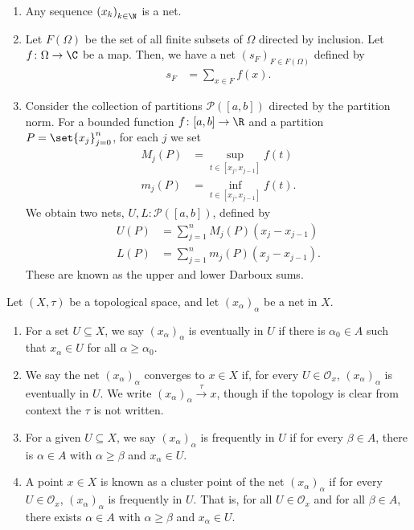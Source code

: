 \begin{example}\hfill
\begin{enumerate}[(1)]
  \item Any sequence $\left(x_k\right)_{k\in \N}$ is a net.
  \item Let $F\left(\Omega\right)$ be the set of all finite subsets of $\Omega$ directed by inclusion. Let $f\colon \Omega\rightarrow \C$ be a map. Then, we have a net $\left(s_F\right)_{F\in F\left(\Omega\right)}$ defined by
    \begin{align*}
      s_F &= \sum_{x\in F}f\left(x\right).
    \end{align*}
  \item Consider the collection of partitions $\mathcal{P}\left([a,b]\right)$ directed by the partition norm. For a bounded function $f\colon [a,b]\rightarrow \R$ and a partition $P = \set{x_j}_{j=0}^{n}$, for each $j$ we set
    \begin{align*}
      M_j\left(P\right) &= \sup_{t\in \left[x_j,x_{j-1}\right]}f(t)\\
      m_j\left(P\right) &= \inf_{t\in \left[x_j,x_{j-1}\right]}f(t).
    \end{align*}
    We obtain two nets, $U,L\colon \mathcal{P}\left([a,b]\right)$, defined by
    \begin{align*}
      U\left(P\right) &= \sum_{j=1}^{n}M_j\left(P\right)\left(x_j - x_{j-1}\right)\\
      L\left(P\right) &= \sum_{j=1}^{n}m_j\left(P\right)\left(x_j-x_{j-1}\right).
    \end{align*}
    These are known as the upper and lower Darboux sums.
\end{enumerate}
\end{example}
\begin{definition}
  Let $\left(X,\tau\right)$ be a topological space, and let $\left(x_{\alpha}\right)_{\alpha}$ be a net in $X$.
  \begin{enumerate}[(1)]
    \item For a set $U\subseteq X$, we say $\left(x_{\alpha}\right)_{\alpha}$ is eventually in $U$ if there is $\alpha_0\in A$ such that $x_{\alpha}\in U$ for all $\alpha \geq \alpha_0$.
    \item We say the net $\left(x_{\alpha}\right)_{\alpha}$ converges to $x\in X$ if, for every $U\in \mathcal{O}_{x}$, $\left(x_{\alpha}\right)_{\alpha}$ is eventually in $U$. We write $\left(x_{\alpha}\right)_{\alpha}\xrightarrow{\tau}x$, though if the topology is clear from context the $\tau$ is not written.
    \item For a given $U\subseteq X$, we say $\left(x_{\alpha}\right)_{\alpha}$ is frequently in $U$ if for every $\beta \in A$, there is $\alpha \in A$ with $\alpha \geq \beta$ and $x_{\alpha}\in U$.
    \item A point $x\in X$ is known as a cluster point of the net $\left(x_{\alpha}\right)_{\alpha}$ if for every $U\in \mathcal{O}_{x}$, $\left(x_{\alpha}\right)_{\alpha}$ is frequently in $U$. That is, for all $U\in \mathcal{O}_{x}$ and for all $\beta \in A$, there exists $\alpha \in A$ with $\alpha \geq \beta$ and $x_{\alpha}\in U$.
  \end{enumerate}
\end{definition}
